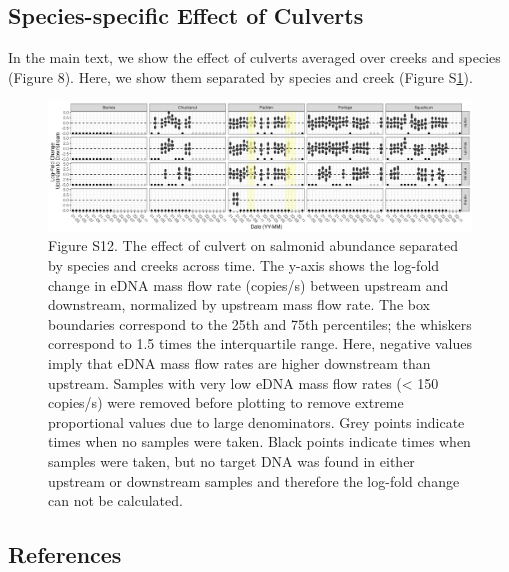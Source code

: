 \documentclass[
]{article}
\begin{document}
\hypertarget{species-specific-effect-of-culverts}{%
\subsection{Species-specific Effect of
Culverts}\label{species-specific-effect-of-culverts}}

In the main text, we show the effect of culverts averaged over creeks
and species (Figure 8). Here, we show them separated by species and
creek (Figure S\ref{fig:culvertsspeciescreek}).

\begin{figure}
\centering
\includegraphics{../Output/SupplementalFigures/culvert_boxplot_separated.png}
\caption{Figure S12. The effect of culvert on salmonid abundance
separated by species and creeks across time. The y-axis shows the
log-fold change in eDNA mass flow rate (copies/s) between upstream and
downstream, normalized by upstream mass flow rate. The box boundaries
correspond to the 25th and 75th percentiles; the whiskers correspond to
1.5 times the interquartile range. Here, negative values imply that eDNA
mass flow rates are higher downstream than upstream. Samples with very
low eDNA mass flow rates (\textless{} 150 copies/s) were removed before
plotting to remove extreme proportional values due to large
denominators. Grey points indicate times when no samples were taken.
Black points indicate times when samples were taken, but no target DNA
was found in either upstream or downstream samples and therefore the
log-fold change can not be calculated.\label{fig:culvertsspeciescreek}}
\end{figure}

\newpage

\hypertarget{references}{%
\subsection*{References}\label{references}}
\end{document}
